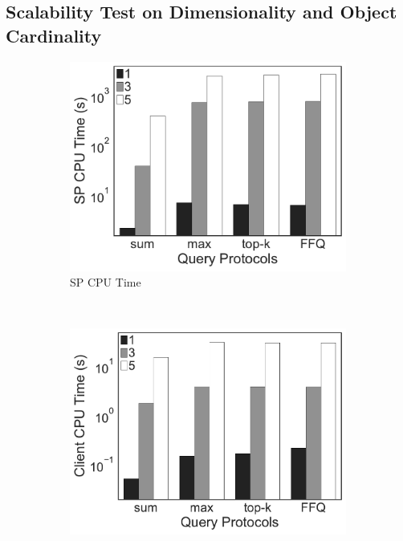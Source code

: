 \subsection{Scalability Test on Dimensionality and Object Cardinality}

\begin{figure}[t]
  \centering
  \begin{subfigure}[b]{.33\linewidth}
    \centering
    \includegraphics[width=\linewidth]{exp-figs/aggregate-queries/dimension_sp.pdf}
    \caption{SP CPU Time}
  \end{subfigure}~%
  \begin{subfigure}[b]{.33\linewidth}
    \centering
    \includegraphics[width=\linewidth]{exp-figs/aggregate-queries/dimension_client.pdf}

\end{subfigure}
\end{figure}
